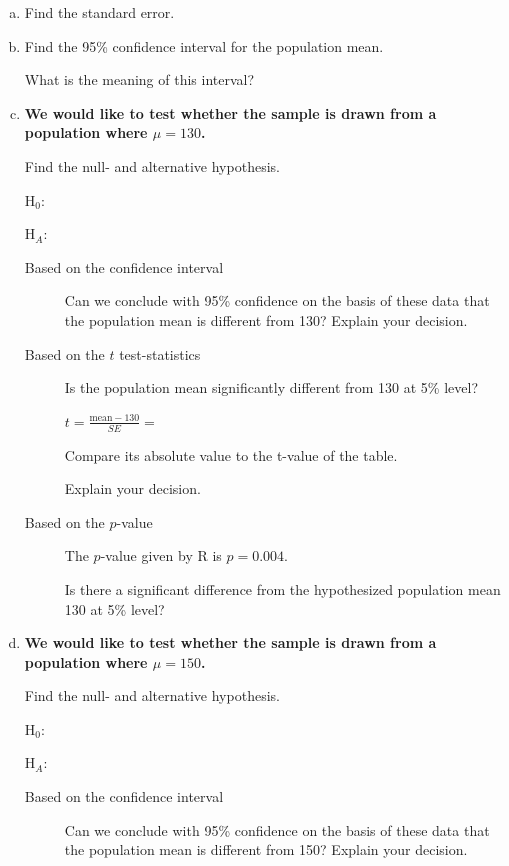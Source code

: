 \begin{enumerate}[a)]
\item Find the standard error.	\hrulefill
\item Find the 95\% confidence interval for the population mean.	
	 \hrulefill

	What is the meaning of this interval? 	  \hrulefill	

\item \textbf{We would like to test whether the sample is drawn from a population where $\mu = 130$.}

Find the null- and alternative hypothesis.
	
	H$_0$:	\hrulefill
	
	H$_A$:	\hrulefill
	
	\begin{description} %
	\item[Based on the confidence interval]
	Can we conclude with 95\% confidence on the basis of these data that the population mean is different from 130? 
	Explain your decision. 
	
	\hrulefill
	
	\item[Based on the $t$ test-statistics]
	


	Is the population mean significantly different from 130 at 5\% level?
	
	$t = \frac{\textrm{mean} - 130}{SE} =$ 	\hrulefill
	
Compare its absolute value to the t-value of the table. 	 \hrulefill
		
		Explain your decision. 	\hrulefill
	\item[Based on the $p$-value]
	The $p$-value given by R is $p = 0.004$.
	
	Is there a significant difference from the hypothesized population mean 130 at 5\% level?

		\hrulefill

	\end{description}
\item \textbf{We would like to test whether the sample is drawn from a population where $\mu = 150$.}
	
Find the null- and alternative hypothesis.
		
		H$_0$:	\hrulefill
		
		H$_A$:	\hrulefill
		
		\begin{description}
		\item[Based on the confidence interval]
	Can we conclude with 95\% confidence on the basis of these data that the population mean is different from 150? 
	Explain your decision. 
	

\end{description}
\end{enumerate}

